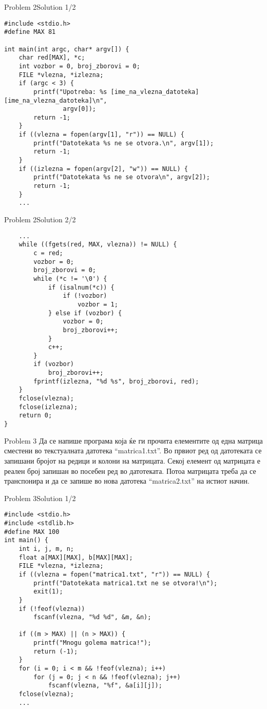 \begin{frame}[fragile]{Problem 2}{Solution 1/2} 
\begin{lstlisting}
#include <stdio.h>
#define MAX 81

int main(int argc, char* argv[]) {
    char red[MAX], *c;
    int vozbor = 0, broj_zborovi = 0;
    FILE *vlezna, *izlezna;
    if (argc < 3) {
        printf("Upotreba: %s [ime_na_vlezna_datoteka] [ime_na_vlezna_datoteka]\n",
                argv[0]);
        return -1;
    }
    if ((vlezna = fopen(argv[1], "r")) == NULL) {
        printf("Datotekata %s ne se otvora.\n", argv[1]);
        return -1;
    }
    if ((izlezna = fopen(argv[2], "w")) == NULL) {
        printf("Datotekata %s ne se otvora\n", argv[2]);
        return -1;
    }
    ...
\end{lstlisting}
\end{frame}



\begin{frame}[fragile]{Problem 2}{Solution 2/2} 
\begin{lstlisting}
    ...
    while ((fgets(red, MAX, vlezna)) != NULL) {
        c = red;
        vozbor = 0;
        broj_zborovi = 0;
        while (*c != '\0') {
            if (isalnum(*c)) {
                if (!vozbor)
                    vozbor = 1;
            } else if (vozbor) {
                vozbor = 0;
                broj_zborovi++;
            }
            c++;
        }
        if (vozbor)
            broj_zborovi++;
        fprintf(izlezna, "%d %s", broj_zborovi, red);
    }
    fclose(vlezna);
    fclose(izlezna);
    return 0;
}
\end{lstlisting}
\end{frame}

\begin{frame}{Problem 3}
Да се напише програма која ќе ги прочита елементите од една матрица сместени во
текстуалната датотека ``matrica1.txt''. Во првиот ред од датотеката се запишани
бројот на редици и колони на матрицата. Секој елемент од матрицата е реален број
запишан во посебен ред во датотеката. Потоа матрицата треба да се транспонира и
да се запише во нова датотека ``matrica2.txt'' на истиот начин.
\end{frame}

\begin{frame}[fragile]{Problem 3}{Solution 1/2} 
\begin{lstlisting}
#include <stdio.h>
#include <stdlib.h>
#define MAX 100
int main() {
    int i, j, m, n;
    float a[MAX][MAX], b[MAX][MAX];
    FILE *vlezna, *izlezna;
    if ((vlezna = fopen("matrica1.txt", "r")) == NULL) {
        printf("Datotekata matrica1.txt ne se otvora!\n");
        exit(1);
    }
    if (!feof(vlezna))
        fscanf(vlezna, "%d %d", &m, &n);

    if ((m > MAX) || (n > MAX)) {
        printf("Mnogu golema matrica!");
        return (-1);
    }
    for (i = 0; i < m && !feof(vlezna); i++)
        for (j = 0; j < n && !feof(vlezna); j++)
            fscanf(vlezna, "%f", &a[i][j]);
    fclose(vlezna);
    ...
\end{lstlisting}
\end{frame}



